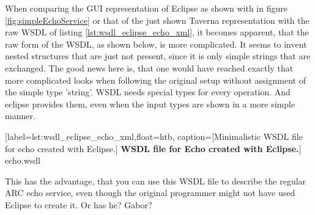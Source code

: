 When comparing the GUI representation of Eclipse as shown with in figure
\ref{fig:simpleEchoService} or that of the just shown Taverna representation
with the raw WSDL of listing \ref{lst:wsdl_eclipse_echo_xml}, it becomes
apparent, that the raw form of the WSDL, as shown below, is more complicated. It seems to invent nested structures that are just not present, since it is only simple strings that are exchanged.
The good news here is, that one would have reached exactly that more
complicated looks when following the original setup without assignment of the
simple type 'string'. WSDL needs special types for every operation. And eclipse
provides them, even when the input types are shown in a more simple manner.



	[label=lst:wsdl_eclipse_echo_xml,float=htb,
	caption={[Minimalistic WSDL file for echo created with Eclipse.]
	\textbf{WSDL file for Echo created with Eclipse.}}]
{echo.wsdl}

This has the advantage, that you can use this WSDL file to describe the regular
ARC echo service, even though the original programmer might not have used
Eclipse to create it. Or has he? Gabor?




